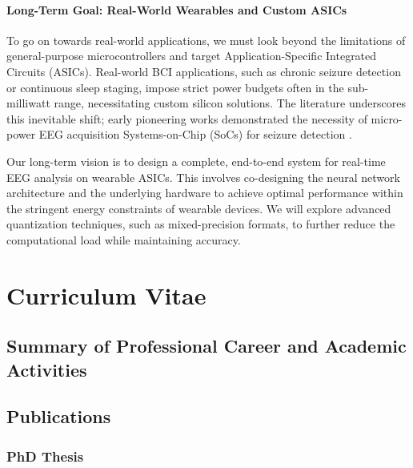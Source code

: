 \documentclass[11pt]{report}
\begin{document}
\subsubsection{Long-Term Goal: Real-World Wearables and Custom ASICs}
To go on towards real-world applications, we must look beyond the limitations of general-purpose microcontrollers and target Application-Specific Integrated Circuits (ASICs). Real-world BCI applications, such as chronic seizure detection or continuous sleep staging, impose strict power budgets often in the sub-milliwatt range, necessitating custom silicon solutions. The literature underscores this inevitable shift; early pioneering works demonstrated the necessity of micro-power EEG acquisition Systems-on-Chip (SoCs) for seizure detection \cite{verma2010micropower}.

Our long-term vision is to design a complete, end-to-end system for real-time EEG analysis on wearable ASICs. This involves co-designing the neural network architecture and the underlying hardware to achieve optimal performance within the stringent energy constraints of wearable devices. We will explore advanced quantization techniques, such as mixed-precision formats, to further reduce the computational load while maintaining accuracy.


\appendix

\chapter{Curriculum Vitae}
\section{Summary of Professional Career and Academic Activities}







\section{Publications}
\subsection{PhD Thesis}
\printbibliography[keyword={MANUSCRIPT}, heading=none]
\end{document}
